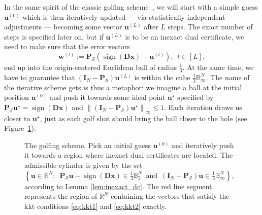 In the same spirit of the classic golfing scheme~\cite{gross2011}, we will start with a simple guess $\mathbf{u}^{(0)}$ which is then iteratively updated --- via statistically independent adjustments --- becoming some vector $\mathbf{u}^{(L)}$ after $L$ steps. The exact number of steps is specified later on, but if $\mathbf{u}^{(L)}$ is to be an inexact dual certificate, we need to make sure that the error vectors
 \begin{equation}
    \mathbf{w}^{(l)} := \mathbf{P}_\mathcal{S} \left( \operatorname{sign} \left ( \mathbf{Dx} \right ) - \mathbf{u}^{(l)} \right), \enspace l \in [L],
    \label{eq:golf_error_vec}
\end{equation}
end up into the origin-centered Euclidean ball of radius $\frac{1}{3}$. At the same time, we have to guarantee that $(\mathbf{I}_N - \mathbf{P}_\mathcal{S}) \mathbf{u}^{(L)}$ is within the cube $\frac{1}{3} \mathbb{B}_{\infty}^N$. The name of the iterative scheme gets is thus a metaphor: we imagine a ball at the initial position $\mathbf{u}^{(0)}$ and push it towards some ideal point $\mathbf{u}^\star$ specified by $\mathbf{P}_{\mathcal{S}} \mathbf{u}^\star =  \operatorname{sign} \left ( \mathbf{Dx} \right )$ and $\left \| \left ( \mathbf{I}_N - \mathbf{P}_\mathcal{S} \right ) \mathbf{u}^\star \right \|_{\infty} \leq 1$. Each iteration draws us closer to $\mathbf{u}^\star$, just as each golf shot should bring the ball closer to the hole (see Figure~\ref{fig:illustration_golfing_scheme}).

\begin{figure}[H]
    \centering
    
    \caption[The golfing scheme]{The golfing scheme. Pick an initial guess $\mathbf{u}^{(0)}$ and iteratively push it towards a region where inexact dual certificates are located. The admissible cylinder is given by the set $\left \{\mathbf{u} \in \mathbb{R}^{N} : \enspace \mathbf{P}_\mathcal{S} \mathbf{u} - \operatorname{sign} \left ( \mathbf{Dx} \right) \in \frac{1}{3}\mathbb{B}_{2}^N \enspace \text{and} \enspace (\mathbf{I}_N - \mathbf{P}_\mathcal{S}) \mathbf{u} \in \frac{1}{3}\mathbb{B}_{\infty}^N \right\}$, according to Lemma \ref{lem:inexact_dc}. The red line segment represents the region of $\mathbb{R}^{N}$ containing the vectors that satisfy the \acrshort{kkt} conditions \eqref{eq:kkt1} and \eqref{eq:kkt2} exactly.}
    \label{fig:illustration_golfing_scheme}
\end{figure}

